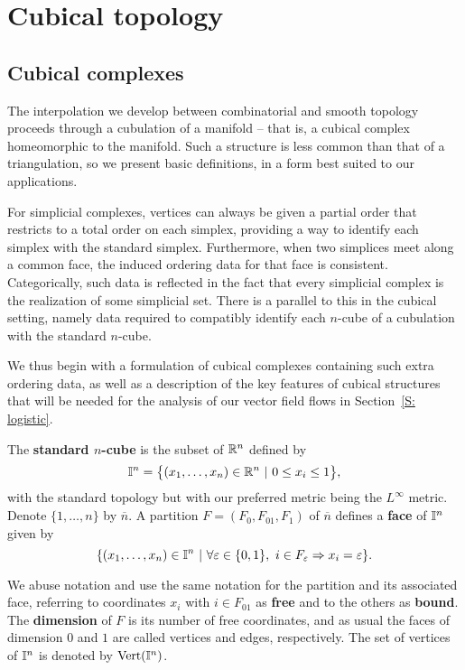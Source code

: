 

\section{Cubical topology} \label{S: cubical topology}

\subsection{Cubical complexes}

The interpolation we develop between combinatorial and smooth topology proceeds through a cubulation of a manifold -- that is, a cubical complex homeomorphic to the manifold.
Such a structure is less common than that of a triangulation, so we present basic definitions,  in a form best suited to our applications. 

For simplicial complexes, vertices can always be given a partial order that restricts to a total order on each simplex, providing a way to identify each simplex with the standard simplex.
Furthermore, when two simplices meet along a common face, the induced ordering data for that face is consistent.
Categorically, such data is reflected in the fact that every simplicial complex is the realization of some simplicial set.
There is a parallel to this in the cubical setting, namely data required to compatibly identify each $n$-cube of a cubulation with the standard $n$-cube.

We thus begin with a formulation of cubical complexes containing such extra ordering data, as well as a description of the key features of cubical structures that will be needed for the analysis of our vector field flows in Section~\ref{S: logistic}.

The \textbf{standard $n$-cube} is the subset of $\mathbb{R}^n$ defined by
\begin{equation*}
\mathbb{I}^n = \big\{ (x_1, \dots, x_n) \in \mathbb{R}^n\ |\ 0 \leq x_i \leq 1 \big\},
\end{equation*}
with the standard topology but with our preferred metric being the $L^\infty$ metric.
Denote $\{1, \dots, n\}$ by $\overline{n}$.
A partition $F = (F_0, F_{01}, F_1)$ of $\overline n$ defines a \textbf{face} of $\mathbb{I}^n$ given by
\begin{equation*}
\{(x_1, \dots, x_n) \in \mathbb{I}^n\ |\ \forall \varepsilon \in \{0, 1\},\ i \in F_\varepsilon \Rightarrow x_i = \varepsilon\}.
\end{equation*}

We abuse notation and use the same notation for the partition and its associated face, referring to coordinates $x_i$ with $i \in F_{01}$ as \textbf{free} 
and to the others as \textbf{bound}.
The \textbf{dimension} of $F$ is its number of free coordinates, and as usual the faces of dimension $0$ and $1$ are called vertices and edges, respectively.
The set of vertices of $\mathbb{I}^n$ is denoted by ${\rm Vert}(\mathbb{I}^n)$.

